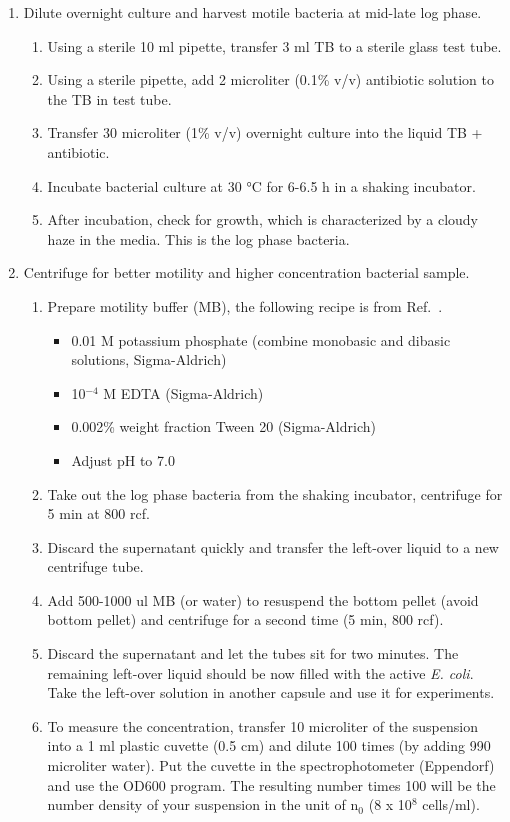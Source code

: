 \begin{enumerate}
  \item Dilute overnight culture and harvest motile bacteria at mid-late log phase.
  \begin{enumerate}
    \item Using a sterile 10 ml pipette, transfer 3 ml TB to a sterile glass test tube.
    \item Using a sterile pipette, add 2 microliter (0.1\% v/v) antibiotic solution to the TB in test tube.
    \item Transfer 30 microliter (1\% v/v) overnight culture into the liquid TB + antibiotic.
    \item Incubate bacterial culture at 30 °C for 6-6.5 h in a shaking incubator.
    \item After incubation, check for growth, which is characterized by a cloudy haze in the media. This is the log phase bacteria.
  \end{enumerate}
  \item Centrifuge for better motility and higher concentration bacterial sample.
  \begin{enumerate}
    \item Prepare motility buffer (MB), the following recipe is from Ref.~\cite{Peng2016}.
    \begin{itemize}
      \item 0.01 M potassium phosphate (combine monobasic and dibasic solutions, Sigma-Aldrich)
      \item 10$^{-4}$ M EDTA (Sigma-Aldrich)
      \item 0.002\% weight fraction Tween 20 (Sigma-Aldrich)
      \item Adjust pH to 7.0
    \end{itemize}
    \item Take out the log phase bacteria from the shaking incubator, centrifuge for 5 min at 800 rcf.
    \item Discard the supernatant quickly and transfer the left-over liquid to a new centrifuge tube.
    \item Add 500-1000 ul MB (or water) to resuspend the bottom pellet (avoid bottom pellet) and centrifuge for a second time (5 min, 800 rcf).
    \item Discard the supernatant and let the tubes sit for two minutes. The remaining left-over liquid should be now filled with the active \textit{E. coli}. Take the left-over solution in another capsule and use it for experiments.
    \item To measure the concentration, transfer 10 microliter of the suspension into a 1 ml plastic cuvette (0.5 cm) and dilute 100 times (by adding 990 microliter water). Put the cuvette in the spectrophotometer (Eppendorf) and use the OD600 program. The resulting number times 100 will be the number density of your suspension in the unit of n$_0$ (8 x 10$^8$ cells/ml).
  \end{enumerate}
\end{enumerate}

